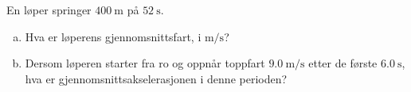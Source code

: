 %
En løper springer $\SI{400}{\metre}$ på $\SI{52}{\second}$.
\begin{enumerate}[a)]
    \item Hva er løperens gjennomsnittsfart, i $\si{\metre\per\second}$?
    \item Dersom løperen starter fra ro og oppnår toppfart $\SI{9.0}{\metre\per\second}$ etter de første $\SI{6.0}{\second}$, hva er gjennomsnittsakselerasjonen i denne perioden?
\end{enumerate}
